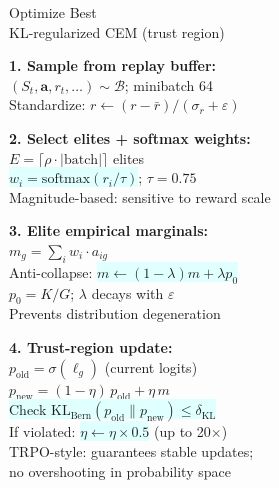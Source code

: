 \documentclass[8pt]{article}
\newlength{\colw}
\begin{document}
\begin{minipage}[t]{\colw}
\begin{tcolorbox}[colback=hdrC, colframe=hdrC, fontupper=\bfseries\footnotesize\color{white},
    arc=2pt, left=2pt, right=2pt, top=1pt, bottom=1pt]
\centering Optimize Best\\[-2pt]
{\scriptsize\mdseries KL-regularized CEM (trust region)}
\end{tcolorbox}
\vspace{1pt}

\begin{keyboxB}
\textbf{1. Sample from replay buffer:}\\
$(S_t, \mathbf{a}, r_t, \ldots) \sim \mathcal{B}$; minibatch 64\\
Standardize: $r \gets (r - \bar{r})/(\sigma_r + \varepsilon)$
\end{keyboxB}\vspace{1pt}

\begin{keyboxB}
\textbf{2. Select elites + softmax weights:}\\
$E = \lceil \rho \cdot |\text{batch}| \rceil$ elites\\
\colorbox{lightcyan}{$w_i = \text{softmax}(r_i / \tau)$}; $\tau = 0.75$\\
{\scriptsize Magnitude-based: sensitive to reward scale}
\end{keyboxB}\vspace{1pt}

\begin{keyboxB}
\textbf{3. Elite empirical marginals:}\\
$m_g = \sum_i w_i \cdot a_{ig}$\\
Anti-collapse: \colorbox{lightcyan}{$m \gets (1{-}\lambda)m + \lambda p_0$}\\
$p_0 = K/G$; $\lambda$ decays with $\varepsilon$\\
{\scriptsize\color{addedB} Prevents distribution degeneration}
\end{keyboxB}\vspace{1pt}

\begin{keyboxB}
\textbf{4. Trust-region update:}\\
$p_\text{old} = \sigma(\ell_g)$ (current logits)\\
$p_\text{new} = (1-\eta)\,p_\text{old} + \eta\, m$\\
\colorbox{lightcyan}{Check $\text{KL}_\text{Bern}(p_\text{old} \| p_\text{new}) \leq \delta_\text{KL}$}\\
If violated: \colorbox{lightcyan}{$\eta \gets \eta \times 0.5$} (up to 20$\times$)\\
{\scriptsize\color{addedB} TRPO-style: guarantees stable updates;\\
no overshooting in probability space}
\end{keyboxB}\vspace{1pt}


\end{minipage}
\end{document}
